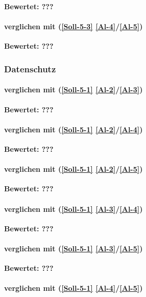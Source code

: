 \textbf{Bewertet: ???}


\paragraph*{  verglichen mit  (\ref{Soll-5-3} \ref{Al-4}/\ref{Al-5})}

\textbf{Bewertet: ???}


\subsubsection{Datenschutz}

\paragraph*{  verglichen mit  (\ref{Soll-5-1} \ref{Al-2}/\ref{Al-3})}

\textbf{Bewertet: ???}

\paragraph*{  verglichen mit  (\ref{Soll-5-1} \ref{Al-2}/\ref{Al-4})}

\textbf{Bewertet: ???}

\paragraph*{  verglichen mit  (\ref{Soll-5-1} \ref{Al-2}/\ref{Al-5})}

\textbf{Bewertet: ???}

\paragraph*{  verglichen mit  (\ref{Soll-5-1} \ref{Al-3}/\ref{Al-4})}

\textbf{Bewertet: ???}

\paragraph*{  verglichen mit  (\ref{Soll-5-1} \ref{Al-3}/\ref{Al-5})}

\textbf{Bewertet: ???}


\paragraph*{  verglichen mit  (\ref{Soll-5-1} \ref{Al-4}/\ref{Al-5})}

